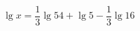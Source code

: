 \begin{ex}[type=equation]
	\begin{condition}
		$\lg x = \dfrac{1}{3}\lg 54 + \lg 5 - \dfrac{1}{3}\lg 16$
	\end{condition}
\end{ex}